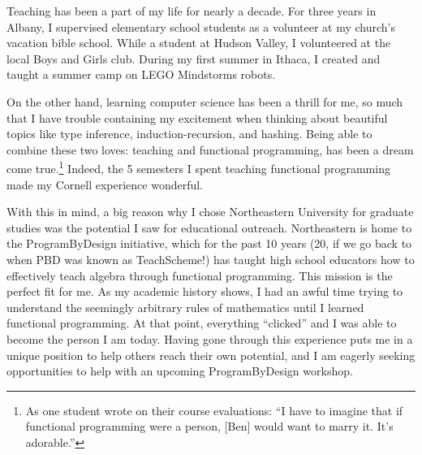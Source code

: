 \documentclass[12pt]{article}
\newcommand{\hdr}[2]{\vspace{-0.4cm}{\flushleft{\hrulefill\\\textbf{#1}\hfill{#2}\\\vspace{-0.2cm}\hrulefill}}\vspace{0.1cm}}
\begin{document}
\hdr{Broader Impacts}{}

Teaching has been a part of my life for nearly a decade.
For three years in Albany, I supervised elementary school students as a volunteer at my church's vacation bible school.
While a student at Hudson Valley, I volunteered at the local Boys and Girls club.
During my first summer in Ithaca, I created and taught a summer camp on LEGO Mindstorms robots.

On the other hand, learning computer science has been a thrill for me, so much that I have trouble containing my excitement when thinking about beautiful topics like type inference, induction-recursion, and hashing.
Being able to combine these two loves: teaching and functional programming, has been a dream come true.\footnote{As one student wrote on their course evaluations: ``I have to imagine that if functional programming were a person, [Ben] would want to marry it. It's adorable.''}
Indeed, the 5 semesters I spent teaching functional programming made my Cornell experience wonderful.

With this in mind, a big reason why I chose Northeastern University for graduate studies was the potential I saw for educational outreach.
Northeastern is home to the ProgramByDesign initiative, which for the past 10 years (20, if we go back to when PBD was known as TeachScheme!) has taught high school educators how to effectively teach algebra through functional programming.
This mission is the perfect fit for me.
As my academic history shows, I had an awful time trying to understand the seemingly arbitrary rules of mathematics until I learned functional programming.
At that point, everything ``clicked'' and I was able to become the person I am today.
Having gone through this experience puts me in a unique position to help others reach their own potential, and I am eagerly seeking opportunities to help with an upcoming ProgramByDesign workshop.

\vfill
\renewcommand{\section}[2]{}
\begin{multicols}{2}
\footnotesize


\end{multicols}
\end{document}
